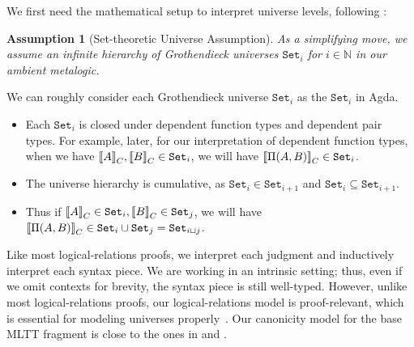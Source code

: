 We first need the mathematical setup to interpret universe levels, following \citet{sterling2019algebraic}:

\newcommand{\Set}[1]{\ensuremath{\texttt{Set}_{#1}}}
\newtheorem{assumption}{Assumption}[section]

\begin{assumption}[Set-theoretic Universe Assumption] As a simplifying move, we assume an infinite hierarchy of Grothendieck universes $\Set{i}$ for $i \in \mathbb{N}$ in our ambient meta\-logic.
\end{assumption}

We can roughly consider each Grothendieck universe $\Set{i}$ as the $\Set{i}$ in Agda. 
\begin{itemize}
  \item Each $\Set{i}$ is closed under dependent function types and dependent
  pair types. For example, later, for our interpretation of dependent function
  types, when we have $\denotesC{A}, \denotesC{B} \in \Set{i}$, we will have
  $\denotesC{\TyPi{A}{B}} \in \Set{i}$.
  \item The universe hierarchy is cumulative, as $\Set{i} \in \Set{i+1}$ and $\Set{i} \subseteq \Set{i+1}$.
  \item Thus if $\denotesC{A} \in \Set{i}, \denotesC{B} \in \Set{j}$, we will
  have $\denotesC{\TyPi{A}{B}} \in \Set{i} \cup \Set{j} = \Set{i \lcup j}$.
\end{itemize}


Like most logical-relations proofs, we interpret each judgment and inductively
interpret each syntax piece. We are working in an intrinsic setting; thus, even if
we omit contexts for brevity, the syntax piece is still well-typed. However,
unlike most logical-relations proofs, our logical-relations model is proof-relevant,
which is essential for modeling universes
properly~\cite{coquand2018canonicity}.
Our canonicity model for the base MLTT fragment is close to the ones
in \citet{coquand2018canonicity} and \citet{sterling2019algebraic}.

